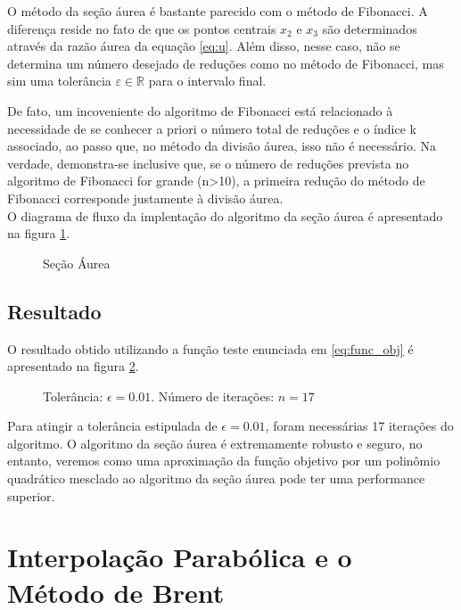 \documentclass[a4paper,12pt,utf8x,notitlepage]{article}
\begin{document}
O método da seção áurea é bastante parecido com o método de Fibonacci. A diferença reside no fato de que os pontos centrais $x_2$ e $x_3$ são determinados através da razão áurea da equação \ref{eq:u}. Além disso, nesse caso, não se determina um número desejado de reduções como no método de Fibonacci, mas sim uma tolerância $\varepsilon \in  \mathbb{R}$ para o intervalo final.

De fato, um incoveniente do algoritmo de Fibonacci está relacionado à necessidade de se conhecer a priori o número total de reduções e o índice k associado, ao passo que, no método da divisão áurea, isso não é necessário. Na verdade, demonstra-se inclusive que, se o número de reduções prevista no algoritmo de Fibonacci for grande (n>10), a primeira redução do método de Fibonacci corresponde justamente à divisão áurea.\\

O diagrama de fluxo da implentação do algoritmo da seção áurea é apresentado na figura \ref{fig:gold}.

\begin{figure}[h!]
\centering
\scalebox{.85}{}
\caption{Seção Áurea}
\label{fig:gold}
\end{figure}

\subsection{Resultado}

\vspace{0.5cm}

O resultado obtido utilizando a função teste enunciada em \ref{eq:func_obj} é apresentado na figura \ref{fig:aurea}.\\

\begin{figure}[h!]
\centering
\scalebox{.85}{}
\caption{Tolerância: $\epsilon =  0.01$. Número de iterações: $n = 17$}
\label{fig:aurea}
\end{figure}

Para atingir a tolerância estipulada de $\epsilon =  0.01$, foram necessárias 17 iterações do algoritmo. O algoritmo da seção áurea é extremamente robusto e seguro, no entanto, veremos como uma aproximação da função objetivo por um polinômio quadrático mesclado ao algoritmo da seção áurea pode ter uma performance superior.

\section{Interpolação Parabólica e o Método de Brent}
\end{document}
